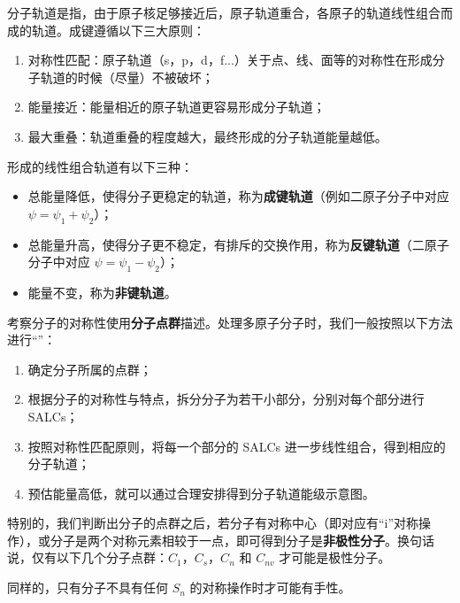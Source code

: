 
分子轨道是指，由于原子核足够接近后，原子轨道重合，各原子的轨道线性组合而成的轨道。成键遵循以下三大原则：
\begin{enumerate}
\item 对称性匹配：原子轨道（s，p，d，f...）关于点、线、面等的对称性在形成分子轨道的时候（尽量）不被破坏；
\item 能量接近：能量相近的原子轨道更容易形成分子轨道；
\item 最大重叠：轨道重叠的程度越大，最终形成的分子轨道能量越低。
\end{enumerate}

形成的线性组合轨道有以下三种：
\begin{itemize}
\item 总能量降低，使得分子更稳定的轨道，称为\textbf{成键轨道}（例如二原子分子中对应 $\psi = \psi_1 + \psi_2$）；
\item 总能量升高，使得分子更不稳定，有排斥的交换作用，称为\textbf{反键轨道}（二原子分子中对应 $\psi = \psi_1 - \psi_2$）；
\item 能量不变，称为\textbf{非键轨道}。
\end{itemize}

考察分子的对称性使用\textbf{分子点群}描述。处理多原子分子时，我们一般按照以下方法进行“”：
\begin{enumerate}
\item 确定分子所属的点群；
\item 根据分子的对称性与特点，拆分分子为若干小部分，分别对每个部分进行 SALCs；
\item 按照对称性匹配原则，将每一个部分的 SALCs 进一步线性组合，得到相应的分子轨道；
\item 预估能量高低，就可以通过合理安排得到分子轨道能级示意图。
\end{enumerate}

特别的，我们判断出分子的点群之后，若分子有对称中心（即对应有“i”对称操作），或分子是两个对称元素相较于一点，即可得到分子是\textbf{非极性分子}。换句话说，仅有以下几个分子点群：$C_1$，$C_s$，$C_n$ 和 $C_{nv}$ 才可能是极性分子。

同样的，只有分子不具有任何 $S_n$ 的对称操作时才可能有手性。


